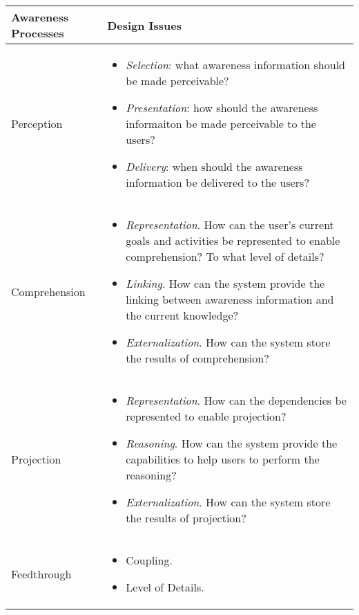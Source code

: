 \begin{longtable}{>{\raggedright}m{1.2in}>{\raggedright}p{4in}}
\toprule 
Awareness Processes & {\small Design Issues}\tabularnewline
\midrule 
{\small Perception} & \begin{itemize}
\item \emph{\small Selection}{\small : what awareness information should
be made perceivable?}{\small \par}
\item \emph{\small Presentation}{\small : how should the awareness informaiton
be made perceivable to the users?}{\small \par}
\item \emph{\small Delivery}{\small : when should the awareness information
be delivered to the users?}\end{itemize}
\tabularnewline
\midrule 
{\small Comprehension} & \begin{itemize}
\item \emph{\small Representation}{\small . How can the user's current goals
and activities be represented to enable comprehension? To what level
of details?}{\small \par}
\item \emph{\small Linking}{\small . How can the system provide the linking
between awareness information and the current knowledge?}{\small \par}
\item \emph{\small Externalization}{\small . How can the system store the
results of comprehension? }\end{itemize}
\tabularnewline
\midrule 
{\small Projection} & \begin{itemize}
\item \emph{\small Representation}{\small . How can the dependencies be
represented to enable projection? }{\small \par}
\item \emph{\small Reasoning}{\small . How can the system provide the capabilities
to help users to perform the reasoning?}{\small \par}
\item \emph{\small Externalization}{\small . How can the system store the
results of projection? }\end{itemize}
\tabularnewline
\midrule 
{\small Feedthrough} & \begin{itemize}
\item {\small Coupling.}{\small \par}
\item {\small Level of Details.}\end{itemize}

\end{longtable}
